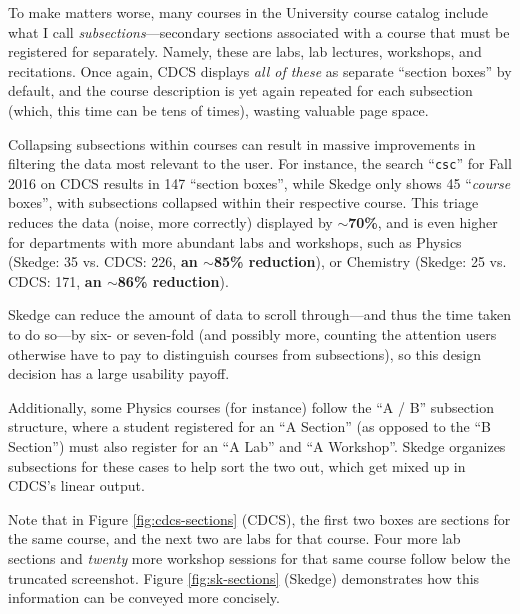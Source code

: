 To make matters worse, many courses in the University course catalog include what I call \emph{subsections}---secondary sections associated with a course that must be registered for separately. Namely, these are labs, lab lectures, workshops, and recitations. Once again, CDCS displays \emph{all of these} as separate ``section boxes'' by default, and the course description is yet again repeated for each subsection (which, this time can be tens of times), wasting valuable page space.

Collapsing subsections within courses can result in massive improvements in filtering the data most relevant to the user. For instance, the search ``{\tt csc}'' for Fall 2016 on CDCS results in 147 ``section boxes'', while Skedge only shows 45 ``\emph{course} boxes'', with subsections collapsed within their respective course. This triage reduces the data (noise, more correctly) displayed by \textbf{$\sim$70\%}, and is even higher for departments with more abundant labs and workshops, such as Physics (Skedge: 35 vs. CDCS: 226, \textbf{an $\sim$85\% reduction}), or Chemistry (Skedge: 25 vs. CDCS: 171, \textbf{an $\sim$86\% reduction}).

Skedge can reduce the amount of data to scroll through---and thus the time taken to do so---by six- or seven-fold (and possibly more, counting the attention users otherwise have to pay to distinguish courses from subsections), so this design decision has a large usability payoff.

Additionally, some Physics courses (for instance) follow the ``A / B'' subsection structure, where a student registered for an ``A Section'' (as opposed to the ``B Section'') must also register for an ``A Lab'' and ``A Workshop''. Skedge organizes subsections for these cases to help sort the two out, which get mixed up in CDCS's linear output.

Note that in Figure \ref{fig:cdcs-sections} (CDCS), the first two boxes are sections for the same course, and the next two are labs for that course. Four more lab sections and \emph{twenty} more workshop sessions for that same course follow below the truncated screenshot. Figure \ref{fig:sk-sections} (Skedge) demonstrates how this information can be conveyed more concisely.

